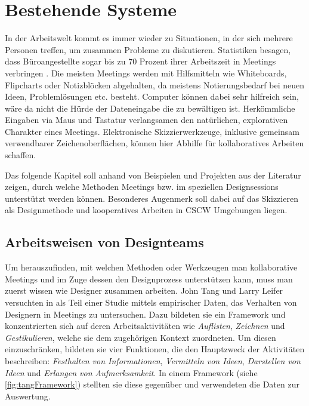 \chapter{Bestehende Systeme}\label{ch:research}
In der Arbeitswelt kommt es immer wieder zu Situationen, in der sich mehrere Personen treffen, um zusammen Probleme zu diskutieren. Statistiken besagen, dass Büroangestellte sogar bis zu 70 Prozent ihrer Arbeitszeit in Meetings verbringen \citep{panko:1993}. Die meisten Meetings werden mit Hilfsmitteln wie Whiteboards, Flipcharts oder Notizblöcken abgehalten, da meistens Notierungsbedarf bei neuen Ideen, Problemlösungen etc. besteht. Computer können dabei sehr hilfreich sein, wäre da nicht die Hürde der Dateneingabe die zu bewältigen ist. Herkömmliche Eingaben via Maus und Tastatur verlangsamen den natürlichen, explorativen Charakter eines Meetings. Elektronische Skizzierwerkzeuge, inklusive gemeinsam verwendbarer Zeichenoberflächen, können hier Abhilfe für kollaboratives Arbeiten schaffen. 

\medskip Das folgende Kapitel soll anhand von Beispielen und Projekten aus der Literatur zeigen, durch welche Methoden Meetings bzw. im speziellen Designsessions unterstützt werden können. Besonderes Augenmerk soll dabei auf das Skizzieren als Designmethode und kooperatives Arbeiten in \ac{CSCW} Umgebungen liegen.

\section{Arbeitsweisen von Designteams}
Um herauszufinden, mit welchen Methoden oder Werkzeugen man kollaborative Meetings und im Zuge dessen den Designprozess unterstützen kann, muss man zuerst wissen wie Designer zusammen arbeiten. John Tang und Larry Leifer versuchten in \citep{Tang:1988p279} als Teil einer Studie mittels empirischer Daten, das Verhalten von Designern in Meetings zu untersuchen. Dazu bildeten sie ein Framework und konzentrierten sich auf deren Arbeitsaktivitäten wie \emph{Auflisten}, \emph{Zeichnen} und \emph{Gestikulieren}, welche sie dem zugehörigen Kontext zuordneten. Um diesen einzuschränken, bildeten sie vier Funktionen, die den Hauptzweck der Aktivitäten beschreiben: \emph{Festhalten von Informationen}, \emph{Vermitteln von Ideen}, \emph{Darstellen von Ideen} und \emph{Erlangen von Aufmerksamkeit}. In einem Framework (siehe \autoref{fig:tangFramework}) stellten sie diese gegenüber und verwendeten die Daten zur Auswertung.

